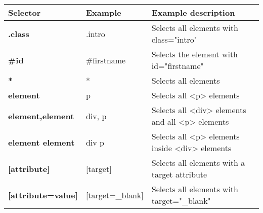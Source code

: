 \documentclass[../main.tex]{subfiles}
\begin{document}
    \begin{table}[H]
        \begin{center}
            \begin{tabular}{|p{3.5cm}||p{4.5cm}|p{8cm}|}
                \hline
                \textbf{Selector} & \textbf{Example} & \textbf{Example description}\\
                \hline
                \hline
                \textbf{.class} & .intro & Selects all elements with class="intro"\\
                \hline
                \textbf{\#id} & \#firstname & Selects the element with id="firstname"\\
                \hline
                \textbf{*} & * & Selects all elements\\
                \hline
                \textbf{element} & p & Selects all <p> elements\\
                \hline
                \textbf{element,element} & div, p & Selects all <div> elements and all <p> elements\\
                \hline
                \textbf{element element} & div p & Selects all <p> elements inside <div> elements\\
                \hline
                \textbf{[attribute]} & [target] & Selects all elements with a target attribute\\
                \hline
                \textbf{[attribute=value]} & [target=\_blank] & Selects all elements with target="\_blank"\\
                \hline
            \end{tabular}
        \end{center}
    \end{table}
\end{document}
